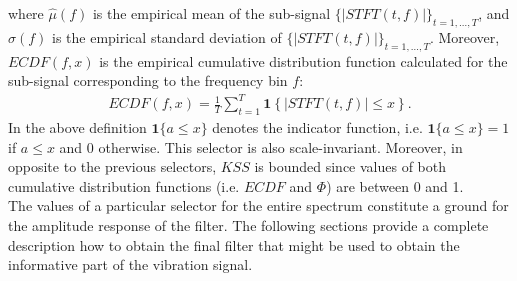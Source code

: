 where $\widehat{\mu}(f)$ is the empirical mean of the sub-signal $\{|STFT(t,f)|\}_{t=1,\ldots,T}$, and $\widehat{\sigma}(f)$ is the empirical standard deviation of $\{|STFT(t,f)|\}_{t=1,\ldots,T}$. Moreover, $ECDF(f,x)$ is the empirical cumulative distribution function calculated for the sub-signal corresponding to the frequency bin $f$:
\begin{eqnarray}\label{filtering_ECDF}
ECDF(f,x)=\frac{1}{T}\sum_{t=1}^{T}\mathbf{1}\left\{ |STFT(t,f)|\leq x\right\}.
\end{eqnarray}
In the above definition $\mathbf{1}\{a\leq x\}$ denotes the indicator function, i.e. $\mathbf{1}\{a\leq x\}=1$ if $a\leq x$ and 0 otherwise. This selector is also scale-invariant. Moreover, in opposite to the previous selectors, $KSS$ is bounded since values of both cumulative distribution functions (i.e. $ECDF$ and $\Phi$) are between 0 and 1.\\
The values of a particular selector for the entire spectrum constitute a ground for the amplitude response of the filter. The following sections provide a complete description how to obtain the final filter that might be used to obtain the informative part of the vibration signal.
